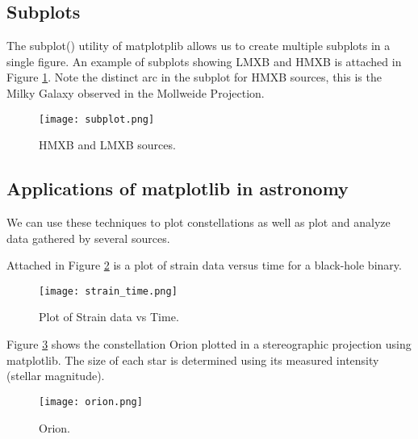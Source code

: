 \documentclass[10pt,a4paper]{article}
\begin{document}
\subsection{Subplots}
The subplot() utility of matplotplib allows us to create multiple subplots in a single figure. An example of subplots showing LMXB and HMXB is attached in Figure \ref{fig:sub}. Note the distinct arc in the subplot for HMXB sources, this is the Milky Galaxy observed in the Mollweide Projection.
\begin{figure}[!h]
\centering
\texttt{[image: subplot.png]}
\caption{\label{fig:sub}HMXB and LMXB sources.}
\end{figure}
\subsection{Applications of matplotlib in astronomy}
We can use these techniques to plot constellations as well as plot and analyze data gathered by several sources.

Attached in Figure \ref{fig:strain1} is a plot of strain data versus time for a black-hole binary.
\begin{figure}[!ht]
\centering
\texttt{[image: strain\_time.png]}
\caption{\label{fig:strain1}Plot of Strain data vs Time.}
\end{figure}
Figure \ref{fig:orion} shows the constellation Orion plotted in a stereographic projection using matplotlib. The size of each star is determined using its measured intensity (stellar magnitude).
\begin{figure}[!ht]
\centering
\texttt{[image: orion.png]}
\caption{\label{fig:orion}Orion.}
\end{figure}
\end{document}
